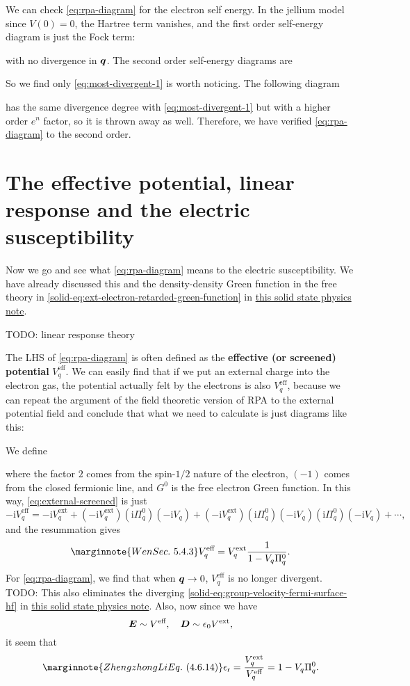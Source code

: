 \documentclass[hyperref, a4paper]{article}
\newcommand*{\ii}{\mathrm{i}}
\newcommand*{\concept}[1]{{\textbf{#1}}}
\newcommand{\soliddoc}{\href{../solid/solid.pdf}{this solid state physics note}}
\begin{document}
We can check \eqref{eq:rpa-diagram} for the electron self energy. In the jellium model since $V(0) = 0$, 
the Hartree term vanishes, and the first order self-energy diagram is just the Fock term: 

with no divergence in $\vb*{q}$. The second order self-energy diagrams are 



So we find only \eqref{eq:most-divergent-1} is worth noticing. The following diagram 

has the same divergence degree with \eqref{eq:most-divergent-1} but with a higher order $e^n$ factor,
so it is thrown away as well. Therefore, we have verified \eqref{eq:rpa-diagram} to the second order.

\section{The effective potential, linear response and the electric susceptibility}\label{sec:response}

Now we go and see what \eqref{eq:rpa-diagram} means to the electric susceptibility. We have already discussed this and the density-density Green function in the free theory in \eqref{solid-eq:ext-electron-retarded-green-function} in \soliddoc. %

TODO: linear response theory

The LHS of \eqref{eq:rpa-diagram} is often defined as the \concept{effective (or screened) potential} $V^\text{eff}_{q}$.
We can easily find that if we put an external charge into the electron gas, the potential actually felt 
by the electrons is also $V^\text{eff}_q$, because we can repeat the argument of the field theoretic version 
of RPA to the external potential field and conclude that what we need to calculate is just diagrams like this:

We define 

where the factor $2$ comes from the spin-$1/2$ nature of the electron, $(-1)$ comes from the closed fermionic line,
and $G^0$ is the free electron Green function. In this way, \eqref{eq:external-screened} is just 
\[
    - \ii V^\text{eff}_q = - \ii V^\text{ext}_q + (- \ii V^\text{ext}_q) (\ii \Pi^0_q) (- \ii V_q) + 
    (- \ii V^\text{ext}_q) (\ii \Pi^0_q) (- \ii V_q) (\ii \Pi^0_q) (- \ii V_q) + \cdots,
\]
and the resummation gives 
\begin{equation} \marginnote{Wen Sec.~5.4.3}
    V^\text{eff}_q = V^\text{ext}_q \frac{1}{1 - V_q \Pi^0_q}.
\end{equation}
For \eqref{eq:rpa-diagram}, we find that when $\vb*{q} \to 0$, $V^\text{eff}_q$ is no longer divergent. 
TODO: This also eliminates the diverging \eqref{solid-eq:group-velocity-fermi-surface-hf} in \soliddoc.
Also, now since we have 
\[
    \vb*{E} \sim V^\text{eff}, \quad \vb*{D} \sim \epsilon_0 V^\text{ext},
\]
it seem that  
\begin{equation} \marginnote{Zhengzhong Li Eq.~(4.6.14)}
    \epsilon_\text{r} = \frac{V^\text{ext}_{q}}{V^\text{eff}_q} = 1 - V_q \Pi^0_q.
    \label{eq:epsilon-r}
\end{equation}
\end{document}
